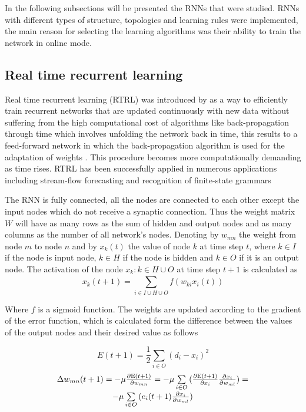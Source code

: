 \documentclass[msc,ai,logo]{infthesis}
\begin{document}
In the following subsections will be presented the RNNs that were studied. RNNs with different types of structure, topologies and learning rules were implemented, the main reason for selecting the learning algorithms was their ability to train the network in online mode. 

\subsection{Real time recurrent learning}

Real time recurrent learning (RTRL) was introduced by \cite{Williams} as a way to efficiently train recurrent networks that are updated continuously with new data without suffering from the high computational cost of algorithms like back-propagation through time which involves unfolding the network back in time, this results to a feed-forward network in which the back-propagation algorithm is used for the adaptation of weights \citep{Werbos}. This procedure becomes more computationally demanding as time rises. RTRL has been successfully applied in numerous applications including stream-flow forecasting \citep{HYP} and recognition of finite-state grammars \citep{smith}

The RNN is fully connected, all the nodes are connected to each other except the input nodes which do not receive a synaptic connection. Thus the weight matrix $W$ will have as many rows as the sum of hidden and output nodes and as many columns as the number of all network's nodes.
Denoting by $w_{mn}$ the weight from node $m$ to node $n$ and by $x_k(t)$ the value of node $k$ at time step $t$, where $k \in I$ if the node is input node, $k \in H$ if the node is hidden and   $k \in O$ if it is an output node. The activation of the node $x_k: k \in H \cup O$ at time step $t+1$ is calculated as 
\begin{equation}
\label{eq:RTac}
{x_k}(t + 1) = \sum\limits_{i \in I \cup H \cup O}^{} {f({w_{ki}}{x_i(t)})} 
\end{equation}

Where $f$ is a sigmoid function. The weights are updated according to the gradient of the error function, which is calculated form the difference between the values of the output nodes and their desired value as follows
  
  \begin{equation}
  E(t+1) = \frac{1}{2}\sum\limits_{i \in O}^{} {{{({d_i} - {x_i})}^2}} 
  \label{eq:RTerr}
  \end{equation}
\begin{equation}
\label{eq:dw}
\begin{array}{c}
\Delta {w_{mn}}(t + 1) =  - \mu \frac{{\partial {\rm E}(t + 1)}}{{\partial {w_{mn}}}} =  - \mu \sum\limits_{i \in O}^{} {(\frac{{\partial {\rm E}(t + 1)}}{{\partial {x_i}}}\frac{{\partial {x_i}}}{{\partial {w_{ml}}}})}  = \\
 - \mu \sum\limits_{i \in O}^{} {({e_i}(t + 1)\frac{{\partial {x_i}}}{{\partial {w_{ml}}}})} 
\end{array}
  \end{equation}
  
\end{document}
